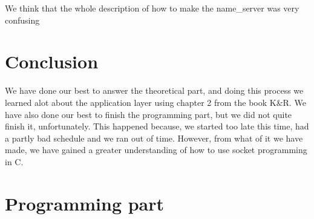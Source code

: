 \documentclass[12pt,a4paper]{article}
\begin{document}
\noindent We think that the whole description of how to make the name\_server was very confusing 

\section{Conclusion}
We have done our best to answer the theoretical part, and doing this process we learned alot about the application layer using chapter 2 from the book K\&R. We have also done our best to finish the programming part, but we did not quite finish it, unfortunately. This happened because, we started too late this time, had a partly bad schedule and we ran out of time. However, from what of it we have made, we have gained a greater understanding of how to use socket programming in C. 

\newpage
\section{Programming part}
\end{document}
